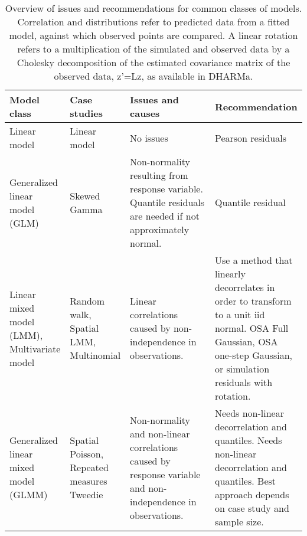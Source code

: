 \begin{table}[h]
    \caption{Overview of issues and recommendations for common classes of models. Correlation and distributions refer to predicted data from a fitted model, against which observed points are compared. A linear rotation refers to a multiplication of the simulated and observed data by a Cholesky decomposition of the estimated covariance matrix of the observed data, z’=Lz, as available in DHARMa.}
    \begin{tabular}{p{0.18\linewidth} p{0.18\linewidth}p{0.33\linewidth}p{0.33\linewidth}}
    \toprule
    Model class & Case studies & Issues and causes & Recommendation\\
    \hline
    Linear model & Linear model & No issues & Pearson residuals \\
    Generalized linear model (GLM) &
    Skewed Gamma &
    Non-normality resulting from response variable. Quantile residuals are needed if not approximately normal. &
    Quantile residual \\
    Linear mixed model (LMM), Multivariate model
 &
    Random walk, Spatial LMM, Multinomial &
    Linear correlations caused by non-independence in observations. &
    Use a method that linearly decorrelates in order to transform to a unit iid normal. OSA Full Gaussian, OSA one-step Gaussian, or simulation residuals with rotation. \\
    Generalized linear mixed model (GLMM) &
    Spatial Poisson, Repeated measures Tweedie &
    Non-normality and non-linear correlations caused by response variable and non-independence in observations.&
    Needs non-linear decorrelation and quantiles. Needs non-linear decorrelation and quantiles. Best approach depends on case study and sample size.\\
    \bottomrule
    \end{tabular}
    \end{table}
